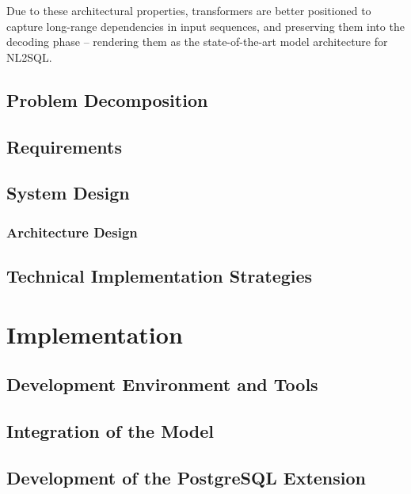 \documentclass{article}
\begin{document}
Due to these architectural properties, transformers are better positioned to capture long-range dependencies in input sequences,
and preserving them into the decoding phase – rendering them as the state-of-the-art model architecture for NL2SQL.








\subsection{Problem Decomposition}

\subsection{Requirements}


\subsection{System Design}

\subsubsection{Architecture Design}

\subsection{Technical Implementation Strategies}

\newpage


\section{Implementation}

\subsection{Development Environment and Tools}

\subsection{Integration of the Model}


\subsection{Development of the PostgreSQL Extension}
\end{document}
